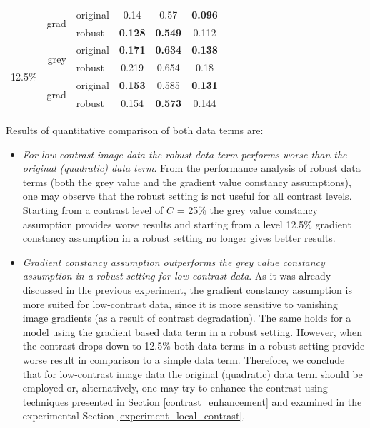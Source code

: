 \begin{table}[ht]
\begin{tabular}{crrcrr}
          & \multicolumn{1}{r}{\multirow{2}[0]{*}{grad}} & \multicolumn{1}{l}{original} & 0.14  & \multicolumn{1}{c}{0.57} & \multicolumn{1}{c}{\textbf{0.096}} \\
          &       & \multicolumn{1}{l}{robust} & \textbf{0.128} & \multicolumn{1}{c}{\textbf{0.549}} & \multicolumn{1}{c}{0.112} \\
          \midrule
    \multicolumn{1}{r}{\multirow{4}[0]{*}{12.5\%}} & \multicolumn{1}{r}{\multirow{2}[0]{*}{grey}} & \multicolumn{1}{l}{original} & \textbf{0.171} & \multicolumn{1}{c}{\textbf{0.634}} & \multicolumn{1}{c}{\textbf{0.138}} \\
          &       & \multicolumn{1}{l}{robust} & 0.219 & \multicolumn{1}{c}{0.654} & \multicolumn{1}{c}{0.18} \\
          & \multicolumn{1}{r}{\multirow{2}[0]{*}{grad}} & \multicolumn{1}{l}{original} & \textbf{0.153} & \multicolumn{1}{c}{0.585} & \multicolumn{1}{c}{\textbf{0.131}} \\
          &       & \multicolumn{1}{l}{robust} & 0.154 & \multicolumn{1}{c}{\textbf{0.573}} & \multicolumn{1}{c}{0.144} \\
    \bottomrule
    \end{tabular}%
  \label{tab:exp_robust_contrast}%
\end{table}%

Results of quantitative comparison of both data terms are:
\begin{itemize}
	\item \textit{For low-contrast image data the robust data term performs worse than the original (quadratic) data term}. From the performance analysis of robust data terms (both the grey value and the gradient value constancy assumptions), one may observe that the robust setting is not useful for all contrast levels. Starting from a contrast level of $C$ = 25\% the grey value constancy assumption provides worse results and starting from a level 12.5\% gradient constancy assumption in a robust setting no longer gives better results.   
	    
	\item \textit{Gradient constancy assumption outperforms the grey value constancy assumption in a robust setting for low-contrast data}. As it was already discussed in the previous experiment, the gradient constancy assumption is more suited for low-contrast data, since it is more sensitive to vanishing image gradients (as a result of contrast degradation). The same holds for a model using the gradient based data term in a robust setting. However, when the contrast drops down to 12.5\% both data terms in a robust setting provide worse result in comparison to a simple data term. Therefore, we conclude that for low-contrast image data the original (quadratic) data term should be employed or, alternatively, one may try to enhance the contrast using techniques presented in Section \ref{contrast_enhancement} and examined in the experimental Section \ref{experiment_local_contrast}.
	
	

\end{itemize}

